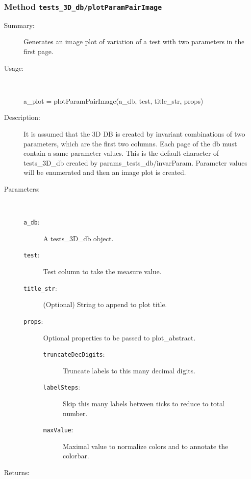 \subsubsection[Method \texttt{plotParamPairImage}]{Method \texttt{tests\_3D\_db/plotParamPairImage}}%
%
\label{ref_tests_3D_db__plotParamPairImage}%
\hypertarget{ref_tests_3D_db__plotParamPairImage}{}%
\begin{description}
\item[Summary:]Generates an image plot of variation of a test with two parameters in the first page.
%
\item[Usage:]~%
\begin{lyxcode}%
a\_plot = plotParamPairImage(a\_db, test, title\_str, props)
%
\end{lyxcode}%
%
\item[Description:]%
It is assumed that the 3D DB is created by invariant combinations of two parameters,
 which are the first two columns. Each page of the db must contain a same parameter 
 values. This is the default character of tests\_3D\_db created by 
 params\_tests\_db/invarParam. Parameter values will be enumerated and then an 
 image plot is created.
\item[Parameters:]~
\begin{description}%
\item[\texttt{a\_db}:]
 A tests\_3D\_db object.
\item[\texttt{test}:]
 Test column to take the measure value.
\item[\texttt{title\_str}:]
 (Optional) String to append to plot title.
\item[\texttt{props}:]
 Optional properties to be passed to plot\_abstract.
\begin{description}%
\item[\texttt{truncateDecDigits}:]
 Truncate labels to this many decimal digits.
\item[\texttt{labelSteps}:]
 Skip this many labels between ticks to reduce to total number.
\item[\texttt{maxValue}:]
 Maximal value to normalize colors and to annotate the colorbar.
\end{description}%
\end{description}%
%
\item[Returns:
]~


\end{description}
